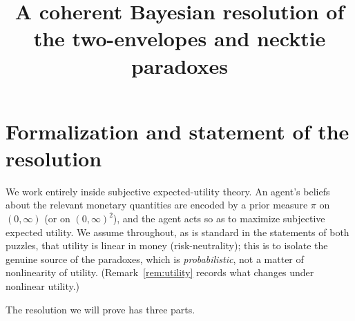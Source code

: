 \documentclass{amsart}
\theoremstyle{plain}
\theoremstyle{definition}
\begin{document}
\title{A coherent Bayesian resolution of the two-envelopes and necktie paradoxes}
\maketitle

\section{Formalization and statement of the resolution}

We work entirely inside subjective expected-utility theory. An agent's beliefs
about the relevant monetary quantities are encoded by a prior measure $\pi$ on
$(0,\infty)$ (or on $(0,\infty)^2$), and the agent acts so as to maximize
subjective expected utility. We assume throughout, as is standard in the
statements of both puzzles, that utility is linear in money (risk-neutrality);
this is to isolate the genuine source of the paradoxes, which is
\emph{probabilistic}, not a matter of nonlinearity of utility. (Remark~\ref{rem:utility}
records what changes under nonlinear utility.)

The resolution we will prove has three parts.
\end{document}
